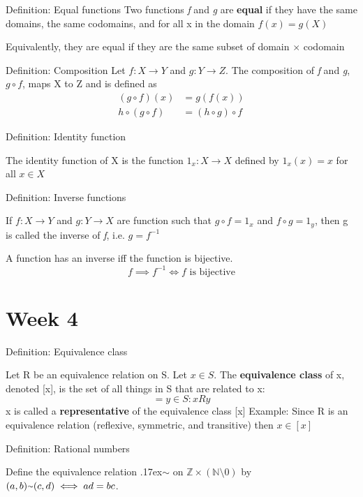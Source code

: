 \documentclass{article}
\newcommand*{\N}{\mathbb{N}}
\newcommand*{\Z}{\mathbb{Z}}
\begin{document}
Definition: Equal functions
Two functions \textit{f} and \textit{g} are \textbf{equal} if they have the same domains, the same codomains, and for all x in the domain \(f(x) = g(X)\)

Equivalently, they are equal if they are the same subset of domain \(\times\) codomain


Definition: Composition
Let \(f: X \to Y\) and \(g: Y \to Z\). The composition of \textit{f} and \textit{g}, \(g \circ f\), maps X to Z and is defined as 
\begin{equation}
\begin{split}
    (g \circ f)(x) &= g(f(x))\\
    h \circ (g \circ f) &= (h \circ g) \circ f
\end{split}
\end{equation}

Definition: Identity function

The identity function of X is the function \(1_x:X \to X\) defined by \(1_x(x) =x\) for all \(x \in X\)

Definition: Inverse functions

If \(f: X \to Y\) and \(g: Y\to X\) are function such that \(g \circ f = 1_x\) and \(f \circ g = 1_y\), then g is called the inverse of \textit{f}, i.e. \(g=f^{-1}\)

A function has an inverse iff the function is bijective.
\begin{equation}
    f \implies f^{-1} \iff f \text{\ is bijective}
\end{equation}

\section{Week 4}
Definition: Equivalence class

Let R be an equivalence relation on S. Let \(x \in S\). The \textbf{equivalence class} of x, denoted [x], is the set of all things in S that are related to x:
\begin{equation}
    [x] = {y \in S: xRy}
\end{equation}
x is called a \textbf{representative} of the equivalence class [x]
Example: Since R is an equivalence relation (reflexive, symmetric, and transitive) then \(x \in [x]\)

Definition: Rational numbers

Define the equivalence relation {\raise.17ex\hbox{$\scriptstyle\mathtt{\sim}$}}
 on \(\Z \times (\N\setminus {0})\) by \((a,b) {\raise.17ex\hbox{$\scriptstyle\mathtt{\sim}$}}
 (c,d) \iff ad=bc\).
\end{document}
